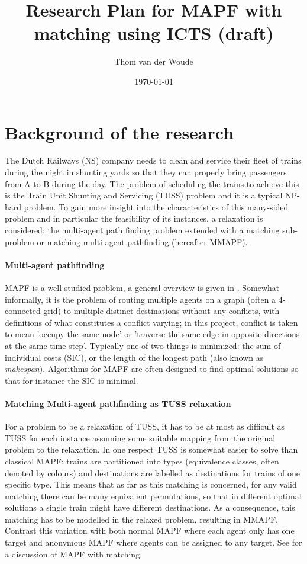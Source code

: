 \documentclass[a4paper,10pt,english]{article}
\title{Research Plan for MAPF with matching using ICTS (draft)}
\author{Thom van der Woude}
\date{\today}
\begin{document}
\maketitle


\section*{Background of the research}
The Dutch Railways (NS) company needs to clean and service their fleet of trains during the night in shunting yards so that they can properly bring passengers from A to B during the day. The problem of scheduling the trains to achieve this is the Train Unit Shunting and Servicing (TUSS) problem \cite{mulderij2020} and it is a typical NP-hard problem. To gain more insight into the characteristics of this many-sided problem and in particular the feasibility of its instances, a relaxation is considered: the multi-agent path finding problem extended with a matching sub-problem or matching multi-agent pathfinding (hereafter MMAPF). 
\paragraph{Multi-agent pathfinding} MAPF is a well-studied problem, a general overview is given in \cite{stern2019}. Somewhat informally, it is the problem of routing multiple agents on a graph (often a 4-connected grid) to multiple distinct destinations without any conflicts, with definitions of what constitutes a conflict varying; in this project, conflict is taken to mean 'occupy the same node' or 'traverse the same edge in opposite directions at the same time-step'. Typically one of two things is minimized: the sum of individual costs (SIC), or the length of the longest path (also known as \textit{makespan}). Algorithms for MAPF are often designed to find optimal solutions so that for instance the SIC is minimal.

\paragraph{Matching Multi-agent pathfinding as TUSS relaxation}
For a problem to be a relaxation of TUSS, it has to be at most as difficult as TUSS for each instance assuming some suitable mapping from the original problem to the relaxation. In one respect TUSS is somewhat easier to solve than classical MAPF: trains are partitioned into types (equivalence classes, often denoted by colours) and destinations are labelled as destinations for trains of one specific type. This means that as far as this matching is concerned, for any valid matching there can be many equivalent permutations, so that in different optimal solutions a single train might have different destinations. As a consequence, this matching has to be modelled in the relaxed problem, resulting in MMAPF. Contrast this variation with both normal MAPF where each agent only has one target and anonymous MAPF where agents can be assigned to any target. See \cite{ma2016} for a discussion of MAPF with matching.
\end{document}
